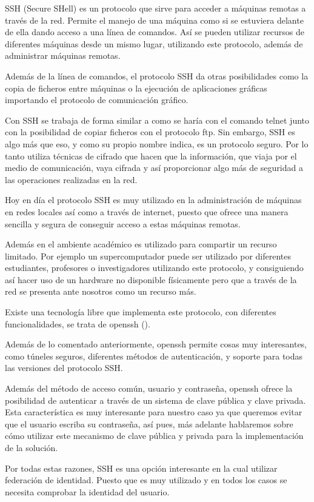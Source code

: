     SSH (Secure SHell) es un protocolo que sirve para acceder a máquinas
    remotas a través de la red. Permite el manejo de una máquina como si se
    estuviera delante de ella dando acceso a una línea de comandos. Así se
    pueden utilizar recursos de diferentes máquinas desde un mismo lugar,
    utilizando este protocolo, además de administrar máquinas remotas.

    Además de la línea de comandos, el protocolo SSH da otras
    posibilidades como la copia de ficheros entre máquinas o la ejecución
    de aplicaciones gráficas importando el protocolo de comunicación
    gráfico.

    Con SSH se trabaja de forma similar a como se haría con el comando
    telnet junto con la posibilidad de copiar ficheros con el protocolo
    ftp. Sin embargo, SSH es algo más que eso, y como su propio nombre
    indica, es un protocolo seguro. Por lo tanto utiliza técnicas de
    cifrado que hacen que la información, que viaja por el medio de
    comunicación, vaya cifrada y así proporcionar algo más de seguridad a
    las operaciones realizadas en la red.

    Hoy en día el protocolo SSH es muy utilizado en la administración de
    máquinas en redes locales así como a través de internet, puesto que
    ofrece una manera sencilla y segura de conseguir acceso a estas
    máquinas remotas.

    Además en el ambiente académico es utilizado para compartir un recurso
    limitado. Por ejemplo un supercomputador puede ser utilizado por
    diferentes estudiantes, profesores o investigadores utilizando este
    protocolo, y consiguiendo así hacer uso de un hardware no disponible
    físicamente pero que a través de la red se presenta ante nosotros como
    un recurso más.

    Existe una tecnología libre que implementa este protocolo, con
    diferentes funcionalidades, se trata de openssh (\cite{openssh}).

    Además de lo comentado anteriormente, openssh permite cosas muy
    interesantes, como túneles seguros, diferentes métodos de
    autenticación, y soporte para todas las versiones del protocolo SSH.

    Además del método de acceso común, usuario y contraseña, openssh ofrece
    la posibilidad de autenticar a través de un sistema de clave pública y
    clave privada. Esta característica es muy interesante para nuestro
    caso ya que queremos evitar que el usuario escriba su contraseña, así
    pues, más adelante hablaremos sobre cómo utilizar este mecanismo de
    clave pública y privada para la implementación de la solución.

    Por todas estas razones, SSH es una opción interesante en la cual
    utilizar federación de identidad. Puesto que es muy utilizado y en
    todos los casos se necesita comprobar la identidad del usuario.



